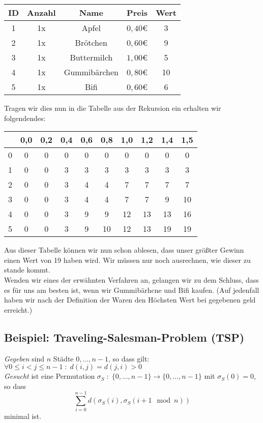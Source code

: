 \begin{tabular}{ccccc}
ID & Anzahl & Name & Preis & Wert\\
\hline
1 & 1x & Apfel & $0,40$\euro{} & 3\\
2 & 1x & Brötchen & $0,60$\euro{} & 9\\
3 & 1x & Buttermilch & $1,00$\euro{} & 5\\
4 & 1x & Gummibärchen & $0,80$\euro{} & 10\\
5 & 1x & Bifi & $0,60$\euro{} & 6\\
\end{tabular}

Tragen wir dies nun in die Tabelle aus der Rekursion ein erhalten wir folgendendes:\\

\begin{tabular}{l|ccccccccc}
& 0,0 & 0,2 & 0,4 & 0,6 & 0,8 & 1,0 & 1,2 & 1,4 & 1,5\\
\hline
0 & 0 & 0 & 0 & 0 & 0 & 0 & 0 & 0 & 0 \\
1 & 0 & 0 & 3 & 3 & 3 & 3 & 3 & 3 & 3\\
2 & 0 & 0 & 3 & 4 & 4 & 7 & 7 & 7 & 7\\
3 & 0 & 0 & 3 & 4 & 4 & 7 & 7 & 9 & 10\\
4 & 0 & 0 & 3 & 9 & 9 & 12 & 13 & 13 & 16\\
5 & 0 & 0 & 3 & 9 & 10 & 12 & 13 & 19 & 19
\end{tabular}

Aus dieser Tabelle können wir nun schon ablesen, dass unser größter Gewinn einen Wert von 19 haben wird. Wir müssen nur noch ausrechnen, wie dieser zu stande kommt.\\

Wenden wir eines der erwähnten Verfahren an, gelangen wir zu dem Schluss, dass es für uns am besten ist, wenn wir Gummibärhcne und Bifi kaufen. (Auf jedenfall haben wir nach der Definition der Waren den Höchsten Wert bei gegebenen geld erreicht.)

\subsection{Beispiel: Traveling-Salesman-Problem (TSP)}

\emph{Gegeben} sind $n$ Städte $0, ... , n-1$, so dass gilt: $\forall 0 \leq i < j \leq n-1 \; : \; d(i,j)= d(j,i) > 0$  \\
\emph{Gesucht} ist eine Permutation $\sigma_S \; : \; \{ 0 , ..., n-1 \} \rightarrow \{0, ... , n-1\}$ mit $\sigma_S(0) = 0$, so dass
$$
\sum_{i=0}^{n-1} d \left( \sigma_S(i), \sigma_S(i + 1 \mod n) \right)
$$
minimal ist.


